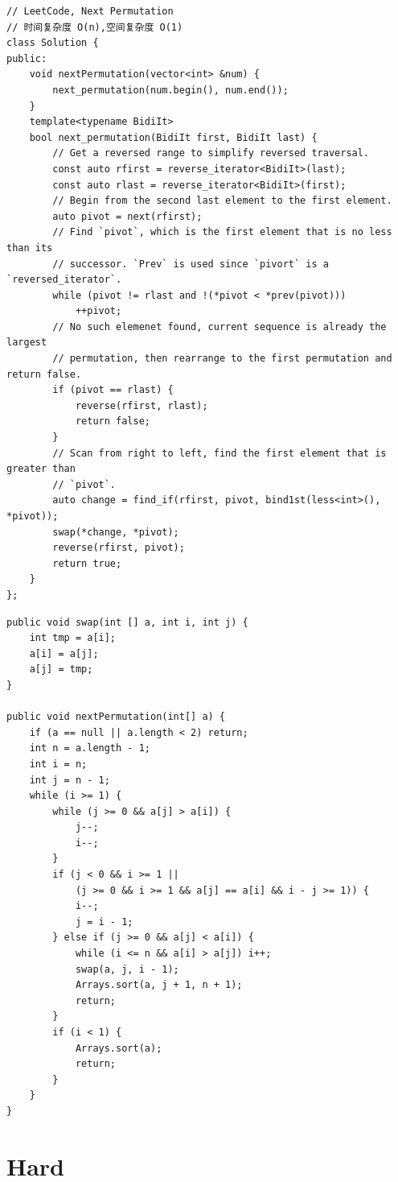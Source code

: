 \documentclass[12pt]{book}
\begin{document}
\lstset{language=java,label= ,caption= ,numbers=none}
\begin{lstlisting}
// LeetCode, Next Permutation
// 时间复杂度 O(n),空间复杂度 O(1)
class Solution {
public:
    void nextPermutation(vector<int> &num) {
        next_permutation(num.begin(), num.end());
    }
    template<typename BidiIt>
    bool next_permutation(BidiIt first, BidiIt last) {
        // Get a reversed range to simplify reversed traversal.
        const auto rfirst = reverse_iterator<BidiIt>(last);
        const auto rlast = reverse_iterator<BidiIt>(first);
        // Begin from the second last element to the first element.
        auto pivot = next(rfirst);
        // Find `pivot`, which is the first element that is no less than its
        // successor. `Prev` is used since `pivort` is a `reversed_iterator`.
        while (pivot != rlast and !(*pivot < *prev(pivot)))
            ++pivot;
        // No such elemenet found, current sequence is already the largest
        // permutation, then rearrange to the first permutation and return false.
        if (pivot == rlast) {
            reverse(rfirst, rlast);
            return false;
        }
        // Scan from right to left, find the first element that is greater than
        // `pivot`.
        auto change = find_if(rfirst, pivot, bind1st(less<int>(), *pivot));
        swap(*change, *pivot);
        reverse(rfirst, pivot);
        return true;
    }
};
\end{lstlisting}
\lstset{language=java,label= ,caption= ,numbers=none}
\begin{lstlisting}
public void swap(int [] a, int i, int j) {
    int tmp = a[i];
    a[i] = a[j];
    a[j] = tmp;
}
        
public void nextPermutation(int[] a) {
    if (a == null || a.length < 2) return;
    int n = a.length - 1;
    int i = n;
    int j = n - 1;
    while (i >= 1) {
        while (j >= 0 && a[j] > a[i]) {
            j--;
            i--;
        } 
        if (j < 0 && i >= 1 ||
            (j >= 0 && i >= 1 && a[j] == a[i] && i - j >= 1)) {
            i--;
            j = i - 1;
        } else if (j >= 0 && a[j] < a[i]) {
            while (i <= n && a[i] > a[j]) i++;
            swap(a, j, i - 1);
            Arrays.sort(a, j + 1, n + 1); 
            return;
        }
        if (i < 1) {
            Arrays.sort(a);
            return;
        }
    }
}
\end{lstlisting}

\section{Hard}
\label{sec-21-3}
\end{document}
